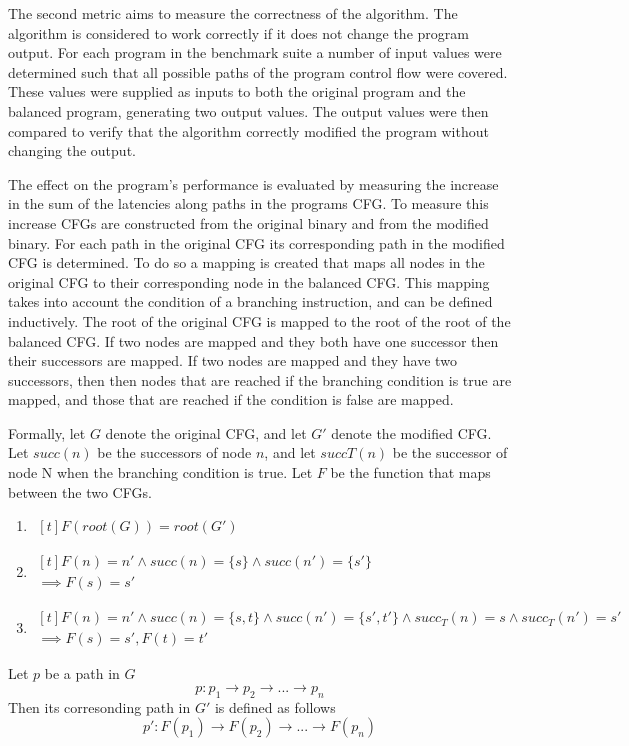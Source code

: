 The second metric aims to measure the correctness of the algorithm. The algorithm is considered to work correctly if it does not change the program output. For each program in the benchmark suite a number of input values were determined such that all possible paths of the program control flow were covered.
These values were supplied as inputs to both the original program and the balanced program, generating two output values. The output values were then compared to 
verify that the algorithm correctly modified the program without changing the output. 

The effect on the program's performance is evaluated by measuring the increase in the sum of the latencies along paths in the programs CFG. 
To measure this increase CFGs are constructed from the original binary and from the modified binary. 
For each path in the original CFG its corresponding path in the modified CFG is determined. To do so a mapping is created that maps all nodes in the original CFG to their corresponding node in the balanced CFG. 
This mapping takes into account the condition of a branching instruction, and can be defined inductively. 
The root of the original CFG is mapped to the root of the root of the balanced CFG. 
If two nodes are mapped and they both have one successor then their successors are mapped. 
If two nodes are mapped and they have two successors, then then nodes that are reached if the branching condition is true are mapped,
and those that are reached if the condition is false are mapped.

Formally, let $G$ denote the original CFG, and let $G'$ denote the modified CFG. Let $succ(n)$ be the successors of node $n$, and let $succT(n)$ be 
the successor of node N when the branching condition is true. Let $F$ be the function that maps between the two CFGs.  
\begin{enumerate}
    \item $\begin{aligned}[t]
    F(root(G)) = root(G')
\end{aligned}$
\item $\begin{aligned}[t]
    F(n) = n' \land succ(n) = \{s\} \land succ(n')=\{s'\} \\ 
    \implies F(s)=s'
\end{aligned}$
\item $\begin{aligned}[t]
    F(n) = n' \land succ(n) = \{s, t\} \land succ(n')=\{s', t'\} \land succ_T(n)=s \land succ_T(n') = s'\\
    \implies F(s)=s', F(t) = t'
\end{aligned}$
\end{enumerate}
Let $p$ be a path in $G$
$$ p: p_1 \rightarrow p_2 \rightarrow ... \rightarrow p_n$$
Then its corresonding path in $G'$ is defined as follows 
$$ p': F(p_1) \rightarrow F(p_2) \rightarrow ... \rightarrow F(p_n)$$

